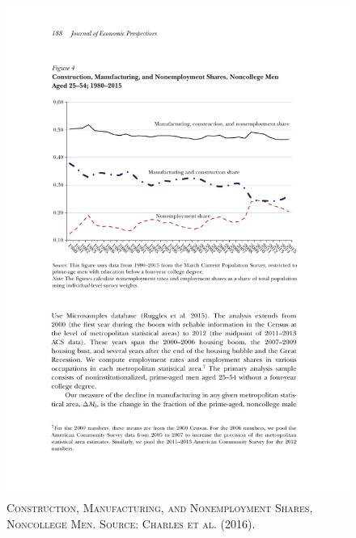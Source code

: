 \documentclass[]{book}
\begin{document}
\begin{figure}

{\centering \includegraphics[width=0.8\linewidth,height=0.8\textheight]{figures/CharlesHurstNotowidigdo2016/fig4} 

}

\caption{\textsc{Construction,
Manufacturing, and Nonemployment Shares, Noncollege Men. Source: Charles
et al. (2016).}}\label{fig:CharlesHurstNotowidigdo2016-fig4}
\end{figure}
\end{document}
